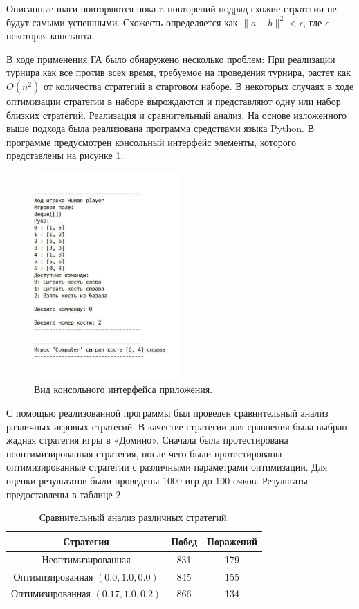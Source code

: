\documentclass[11pt]{article}
\begin{document}
Описанные шаги повторяются пока n повторений подряд схожие стратегии не будут самыми успешными. Схожесть определяется как $\|a-b\|^2<\epsilon$, где $\epsilon$ некоторая константа.

В ходе применения ГА было обнаружено несколько проблем: 
При реализации турнира как все против всех время, требуемое на проведения турнира, растет как $O(n^2)$ от количества стратегий в стартовом наборе.
В некоторых случаях в ходе оптимизации стратегии в наборе вырождаются и представляют одну или набор близких стратегий.
Реализация и сравнительный анализ. На основе изложенного выше подхода была реализована программа средствами языка Python. В программе предусмотрен консольный интерфейс элементы, которого представлены на рисунке 1.

{\newpage}
\begin{figure}
    \centering
    \includegraphics[width=0.5\textwidth]{DOMINO.pdf}
    \caption{\label{fig:consoleapplicationview}Вид консольного интерфейса приложения.}
  \end{figure}

С помощью реализованной программы был проведен сравнительный анализ различных игровых стратегий. В качестве стратегии для сравнения была выбран жадная стратегия игры в «Домино». Сначала была протестирована неоптимизированная стратегия, после чего были протестированы оптимизированные стратегии с различными параметрами оптимизации. Для оценки результатов были проведены 1000 игр до 100 очков. Результаты предоставлены в таблице 2. 

\begin{table}[h!]\begin{center}\caption{Сравнительный анализ различных стратегий.}
\begin{tabular}{|c|c|c|}\hline
  Стратегия & Побед & Поражений  \\ \hline 
  Неоптимизированная & 831 & 179 \\ \hline
  Оптимизированная $(0.0, 1.0, 0.0)$ & 845 & 155 \\ \hline
  Оптимизированная $(0.17, 1.0, 0.2)$ & 866 & 134 \\ \hline
\end{tabular}\label{tab:comparing strategy analyze}
\end{center}\end{table}
\end{document}
